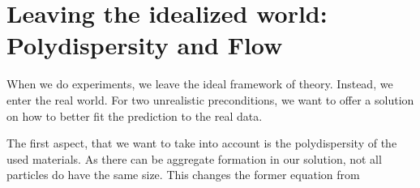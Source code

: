 \section[Polydispersity and Flow]{Leaving the idealized world: Polydispersity and Flow}
\label{sec:PoldysAndFlow}

When we do experiments, we leave the ideal framework of theory. Instead, we enter the real world. For two unrealistic 
preconditions, we want to offer a solution on how to better fit the prediction to the real data.

The first aspect, that we want to take into account is the polydispersity of the 
used materials. As there can be aggregate formation in our solution, not all particles do have the same size. This changes the 
former equation from  